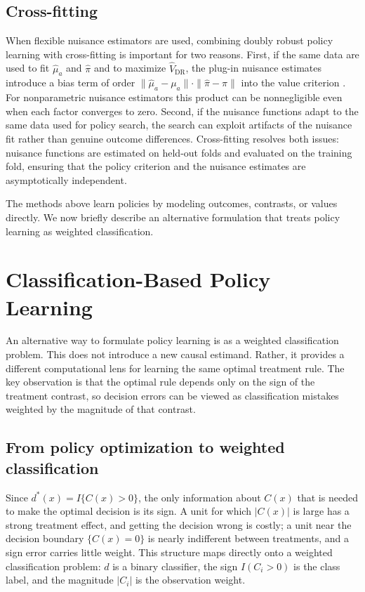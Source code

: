 \documentclass[master.tex]{subfiles}
\begin{document}
\subsection{Cross-fitting}

When flexible nuisance estimators are used, combining doubly robust policy
learning with cross-fitting is important for two reasons. First, if the same
data are used to fit \(\hat\mu_a\) and \(\hat\pi\) and to maximize
\(\widehat V_{\mathrm{DR}}\), the plug-in nuisance estimates introduce a
bias term of order \(\|\hat\mu_a-\mu_a\|\cdot\|\hat\pi-\pi\|\) into the
value criterion \citep{chernozhukov2018double}. For nonparametric nuisance
estimators this product can be nonnegligible even when each factor converges
to zero. Second, if the nuisance functions adapt to the same data used for
policy search, the search can exploit artifacts of the nuisance fit rather
than genuine outcome differences. Cross-fitting resolves both issues: nuisance
functions are estimated on held-out folds and evaluated on the training fold,
ensuring that the policy criterion and the nuisance estimates are asymptotically
independent.

The methods above learn policies by modeling outcomes, contrasts, or values directly. We now briefly describe an alternative formulation that treats policy learning as weighted classification.

\section{Classification-Based Policy Learning}
\label{w14:sec:classification}

An alternative way to formulate policy learning is as a weighted classification problem. This does not introduce a new causal estimand. Rather, it provides a different computational lens for learning the same optimal treatment rule. The key observation is that the optimal rule depends only on the sign of the treatment contrast, so decision errors can be viewed as classification mistakes weighted by the magnitude of that contrast.

\subsection{From policy optimization to weighted classification}
\label{w14:subsec:class-reform}

Since \(d^\ast(x)=I\{C(x)>0\}\), the only information about \(C(x)\) that is needed to make the optimal decision is its sign. A unit for which \(|C(x)|\) is large has a strong treatment effect, and getting the decision wrong is costly; a unit near the decision boundary \(\{C(x)=0\}\) is nearly indifferent between treatments, and a sign error carries little weight. This structure maps directly onto a weighted classification problem: \(d\) is a binary classifier, the sign \(I(C_i>0)\) is the class label, and the magnitude \(|C_i|\) is the observation weight.
\end{document}
